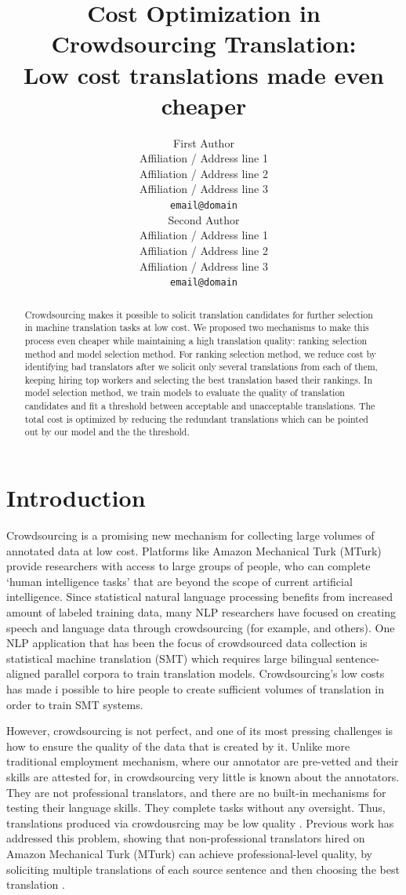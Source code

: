 \documentclass[11pt]{article}
\title{Cost Optimization in Crowdsourcing Translation:\\ Low cost translations made even cheaper}
\author{First Author \\
  Affiliation / Address line 1 \\
  Affiliation / Address line 2 \\
  Affiliation / Address line 3 \\
  {\tt email@domain} \\\And
  Second Author \\
  Affiliation / Address line 1 \\
  Affiliation / Address line 2 \\
  Affiliation / Address line 3 \\
  {\tt email@domain} \\}
\date{}
\begin{document}
\maketitle
\begin{abstract}
Crowdsourcing makes it possible to solicit translation candidates for further selection  in machine translation tasks  at low cost. We proposed two mechanisms to make this process even cheaper while maintaining a high translation quality: ranking selection method and model selection method. For ranking selection method, we reduce cost by identifying bad translators after we solicit only several translations from each of them, keeping hiring top workers and selecting the best translation based their rankings. In model selection method, we train models to evaluate the quality of translation candidates and fit a threshold between acceptable and unacceptable translations.
The total cost is optimized by reducing the redundant translations which can be pointed out by our model and the the threshold. 
 \end{abstract}

\section{Introduction}

Crowdsourcing is a promising new mechanism for collecting large volumes of annotated data at low cost.  Platforms like Amazon Mechanical Turk (MTurk) provide researchers with access to large groups of people, who can complete `human intelligence tasks' that are beyond the scope of current artificial intelligence.  Since statistical natural language processing benefits from increased amount of labeled training data, many NLP researchers have focused on creating speech and language data through crowdsourcing (for example,   and others).  One NLP application that has been the focus of crowdsourced data collection is statistical machine translation (SMT) which requires large bilingual sentence-aligned parallel corpora to train translation models.  Crowdsourcing's low costs has made i possible to hire people to create sufficient volumes of translation in order to train SMT systems.

However, crowdsourcing is not perfect, and one of its most pressing challenges is how to ensure the quality of the data that is created by it.  Unlike more traditional employment mechanism, where our annotator are pre-vetted and their skills are attested for, in crowdsourcing very little is known about the annotators.  They are not professional translators, and there are no built-in mechanisms for testing their language skills.  They complete tasks without any oversight. Thus, translations produced via crowdousrcing may be low quality .
Previous work has addressed this problem, showing that non-professional translators hired on Amazon Mechanical Turk (MTurk) can achieve professional-level quality, by soliciting multiple translations of each source sentence and then choosing the best translation \cite{zaidan-callisonburch:2011:ACL-HLT2011a}.
\end{document}
